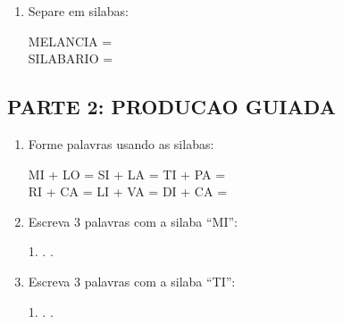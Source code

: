 \begin{exercicio}
\begin{enumerate}
  \item Separe em silabas:
  \begin{center}
  MELANCIA = \underline{\hspace{1cm}} \underline{\hspace{1cm}} \underline{\hspace{1cm}} \underline{\hspace{1cm}}\\
  SILABARIO = \underline{\hspace{1cm}} \underline{\hspace{1cm}} \underline{\hspace{1cm}} \underline{\hspace{1cm}}
  \end{center}
\end{enumerate}

\subsection*{PARTE 2: PRODUCAO GUIADA}

\begin{enumerate}[resume]
  \item Forme palavras usando as silabas:
  \begin{center}
  MI + LO = \underline{\hspace{2cm}} \quad SI + LA = \underline{\hspace{2cm}} \quad TI + PA = \underline{\hspace{2cm}}\\[0.5em]
  RI + CA = \underline{\hspace{2cm}} \quad LI + VA = \underline{\hspace{2cm}} \quad DI + CA = \underline{\hspace{2cm}}
  \end{center}

  \item Escreva 3 palavras com a silaba ``MI'':
  \begin{center}
  1. \underline{\hspace{3cm}} . \underline{\hspace{3cm}} . \underline{\hspace{3cm}}
  \end{center}

  \item Escreva 3 palavras com a silaba ``TI'':
  \begin{center}
  1. \underline{\hspace{3cm}} . \underline{\hspace{3cm}} . \underline{\hspace{3cm}}
  \end{center}


\end{enumerate}
\end{exercicio}
